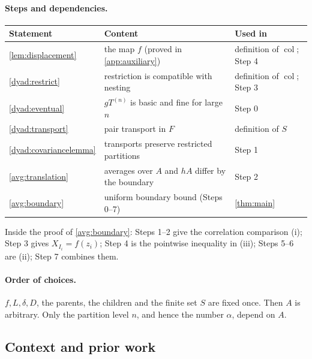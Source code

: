 \documentclass[11pt]{article}
\DeclareMathOperator{\colr}{col}
\theoremstyle{definition}
\numberwithin{equation}{section}
\begin{document}
\paragraph{Steps and dependencies.}
\begin{center}
\begin{tabular}{@{}lll@{}}
\toprule
Statement & Content & Used in\\
\midrule
\cref{lem:displacement} & the map \(f\) (proved in \cref{app:auxiliary}) &
   definition of \(\colr\); Step 4\\
\cref{dyad:restrict} & restriction is compatible with nesting &
   definition of \(\colr\); Step 3\\
\cref{dyad:eventual} & \(gT^{(n)}\) is basic and fine for large \(n\) & Step 0\\
\cref{dyad:transport} & pair transport in \(F\) & definition of \(S\)\\
\cref{dyad:covariancelemma} & transports preserve restricted partitions & Step 1\\
\cref{avg:translation} & averages over \(A\) and \(hA\) differ by the boundary & Step 2\\
\cref{avg:boundary} & uniform boundary bound (Steps 0--7) & \cref{thm:main}\\
\bottomrule
\end{tabular}
\end{center}
Inside the proof of \cref{avg:boundary}: Steps 1--2 give the correlation
comparison (i); Step 3 gives \(X_{I_i}=f(z_i)\); Step 4 is the pointwise
inequality in (iii); Steps 5--6 are (ii); Step 7 combines them.

\paragraph{Order of choices.}
\(f,L,\delta,D\), the parents, the children and the finite set \(S\) are
fixed once. Then \(A\) is arbitrary. Only the partition level \(n\), and
hence the number \(\alpha\), depend on \(A\).

\subsection{Context and prior work}
\end{document}
